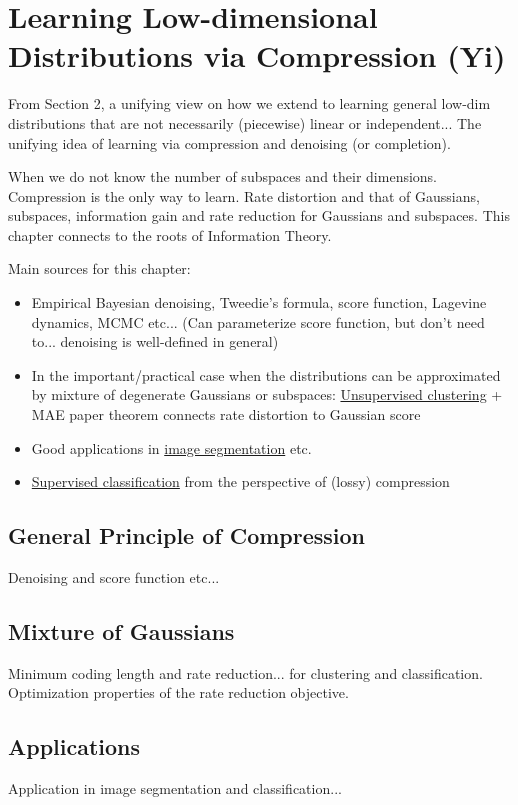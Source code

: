 \documentclass{article}
\begin{document}
\section{Learning Low-dimensional Distributions via Compression (Yi)}
From Section 2, a unifying view on how we extend to learning general low-dim distributions that are not necessarily (piecewise) linear or independent... The unifying idea of learning via compression and denoising (or completion).

When we do not know the number of subspaces and their dimensions. Compression is the only way to learn. Rate distortion and that of Gaussians, subspaces, information gain and rate reduction for Gaussians and subspaces. This chapter connects to the roots of Information Theory. 

Main sources for this chapter: 
\begin{itemize}
\item 
Empirical Bayesian denoising, Tweedie's formula, score function, Lagevine dynamics, MCMC etc... (Can parameterize score function, but don't need to... denoising is well-defined in general)
\item In the important/practical case when the distributions can be approximated by mixture of degenerate Gaussians or subspaces: \href{http://people.eecs.berkeley.edu/~yima/psfile/Ma-PAMI07.pdf}{Unsupervised clustering} + MAE paper theorem connects rate distortion to Gaussian score
\item Good applications in \href{http://people.eecs.berkeley.edu/~yima/psfile/MobahiH2011-IJCV.pdf}{image segmentation} etc. 
\item \href{http://people.eecs.berkeley.edu/~yima/psfile/MICL_SJIS.pdf}{Supervised classification} from the perspective of (lossy) compression
\end{itemize}

\subsection{General Principle of Compression}
Denoising and score function etc... 

\subsection{Mixture of Gaussians}
Minimum coding length and rate reduction... for clustering and classification. Optimization properties of the rate reduction objective.

\subsection{Applications}
Application in image segmentation and classification... 
\end{document}
